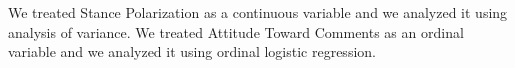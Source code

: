 We treated Stance Polarization as a continuous variable and we analyzed it using analysis of variance.
We treated Attitude Toward Comments as an ordinal variable and we analyzed it using ordinal logistic regression.

